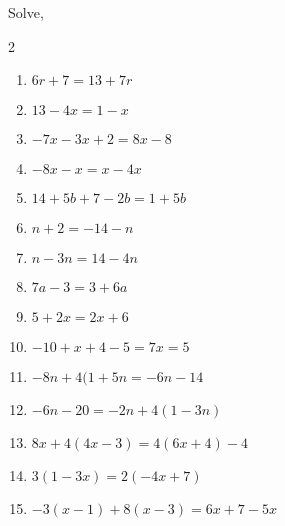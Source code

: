 \documentclass[12pt]{article}
\newenvironment{problem}[2][Problem]{\begin{trivlist}
\item[\hskip \labelsep {\bfseries #1}\hskip \labelsep {\bfseries #2.}]}{\end{trivlist}}
\newenvironment{sol}
    {\emph{Solution:}
    }
    {
    \qed
    }
\begin{document}


\begin{problem}{1}
  Solve,
\begin{multicols}{2}
  \begin{enumerate}[label=\roman*)]
  \item $6r+7=13+7r $ 
  \item $13-4x=1-x $ 
  \item $-7x-3x+2=8x-8 $
  \item $-8x-x=x-4x $
  \item $14+5b+7-2b = 1+5b $ 
  \item $n+2=-14-n $     
  \item $n-3n=14-4n $ 
  \item $7a-3=3+6a $ 
  \item $5+2x=2x+6 $ 
  \item $ -10+x+4-5=7x=5$ 
  \item $ -8n+4(1+5n=-6n-14$ 
  \item $-6n-20=-2n+4(1-3n) $ 
  \item $8x+4(4x-3)=4(6x+4)-4 $
  \item $ 3(1-3x)=2(-4x+7)$
  \item $-3(x-1)+8(x-3)=6x+7-5x $ 
  \end{enumerate}
\end{multicols}
\end{problem}
\end{document}
